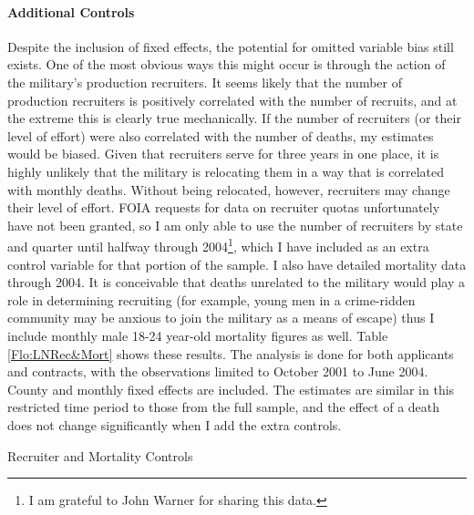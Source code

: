 \documentclass[12pt] {article}
\begin{document}
\paragraph{Additional Controls}

Despite the inclusion of fixed effects, the potential for omitted
variable bias still exists. One of the most obvious ways this might
occur is through the action of the military's production recruiters.
It seems likely that the number of production recruiters is positively
correlated with the number of recruits, and at the extreme this is
clearly true mechanically. If the number of recruiters (or their level
of effort) were also correlated with the number of deaths, my estimates
would be biased. Given that recruiters serve for three years in one
place, it is highly unlikely that the military is relocating them
in a way that is correlated with monthly deaths. Without being relocated,
however, recruiters may change their level of effort. FOIA requests for data on recruiter quotas unfortunately have not been granted, so I am only able to use the number of recruiters by state and quarter until halfway through 2004\footnote{I am grateful to John Warner for sharing this data.}, which I have included as an extra control variable for that portion of the sample. I also have detailed mortality data through 2004. It is conceivable that deaths unrelated to
the military would play a role in determining recruiting (for example,
young men in a crime-ridden community may be anxious to join the military
as a means of escape) thus I include monthly male 18-24 year-old mortality figures
as well. Table \ref{Flo:LNRec&Mort} shows these results. The
analysis is done for both applicants and contracts, with the observations
limited to October 2001 to June 2004. County and monthly
fixed effects are included. The estimates are similar in this restricted time period to those from the full sample, and the effect of a death does not change significantly when I add the extra controls. %

\begin{table}
\caption{Recruiter and Mortality Controls}
\label{Flo:LNRec&Mort}
\end{table}
\end{document}
